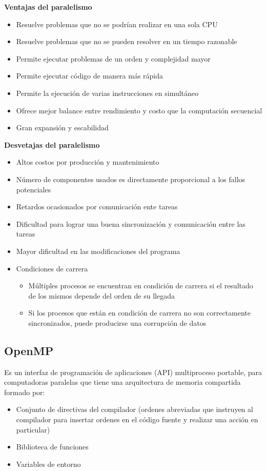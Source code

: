 \documentclass{article}
\begin{document}
\textbf{Ventajas del paralelismo}
\begin{itemize}
    \item Resuelve problemas que no se podrían realizar en una sola CPU
    \item Resuelve problemas que no se pueden resolver en un tiempo razonable
    \item Permite ejecutar problemas de un orden y complejidad mayor
    \item Permite ejecutar código de manera más rápida 
    \item Permite la ejecución de varias instrucciones en simultáneo
    \item Ofrece mejor balance entre rendimiento y costo que la computación secuencial
    \item Gran expansión y escabilidad
\end{itemize}

\textbf{Desvetajas del paralelismo}
\begin{itemize}
    \item Altos costos por producción y mantenimiento
    \item Número de componentes usados es directamente proporcional a los fallos potenciales
    \item Retardos ocasionados por comunicación ente tareas
    \item Dificultad para lograr una buena sincronización y comunicación entre las tareas 
    \item Mayor dificultad en las modificaciones del programa
    \item Condiciones de carrera
    \begin{itemize}
        \item Múltiples procesos se encuentran en condición de carrera si el resultado de los mismos depende del orden de su llegada
        \item Si los procesos que están en condición de carrera no son correctamente sincronizados, puede producirse una corrupción de datos 
    \end{itemize}
\end{itemize}
\subsection{OpenMP}

Es un interfaz de programación de aplicaciones (API) multiproceso portable, para computadoras paralelas que  tiene una arquitectura de memoria compartida formado por: 
\begin{itemize}
    \item Conjunto de directivas del compilador (ordenes abreviadas que instruyen al compilador  para insertar ordenes en el código fuente y realizar una acción en particular)
    \item Biblioteca de funciones
    \item  Variables de entorno
\end{itemize}
 
\end{document}
